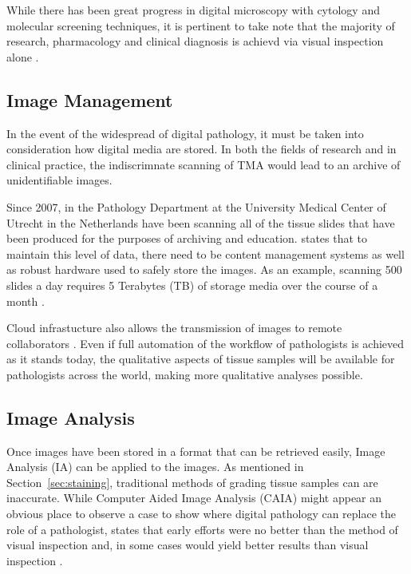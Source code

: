 \documentclass[12pt]{article}
\begin{document}
While there has been great progress in digital microscopy with cytology and molecular screening techniques, it is 
pertinent to take note that the majority of research, pharmacology and clinical diagnosis is achievd via visual 
inspection alone \parencite[p.~24]{mccavigan2012digital}.

\subsection{Image Management}
In the event of the widespread of digital pathology, it must be taken into consideration how digital media are stored. 
In both the fields of research and in clinical practice, the indiscrimnate scanning of TMA would lead to an archive 
of unidentifiable images.

Since 2007, \parencite{stathonikos2013going} in the Pathology Department at the University Medical Center of Utrecht 
in the Netherlands have been scanning all of the tissue slides that have been produced for the purposes of archiving 
and education. \parencite{hamilton2014digital} states that to maintain this level of data, there need to be content 
management systems as well as robust hardware used to safely store the images. As an example, scanning 500 slides 
a day requires 5 Terabytes (TB) of storage media over the course of a month \parencite{hamilton2014digital}.

Cloud infrastucture also allows the transmission of images to remote collaborators \parencite{webster2014whole}. Even 
if full automation of the workflow of pathologists is achieved as it stands today, the qualitative aspects of tissue 
samples will be available for pathologists across the world, making more qualitative analyses possible.

\subsection{Image Analysis} \label{sec:imageanalysis}
Once images have been stored in a format that can be retrieved easily, Image Analysis (IA) can be applied to the 
images. As mentioned in Section~\ref{sec:staining}, traditional methods of grading tissue samples can are inaccurate. 
While Computer Aided Image Analysis (CAIA) might appear an obvious place to observe a case to show where digital 
pathology can replace the role of a pathologist, \citeauthor{dabbs2013diagnostic} states that early efforts were no 
better than the method of visual inspection and, in some cases would yield better results than visual inspection 
\parencite{dabbs2013diagnostic}.
\end{document}
